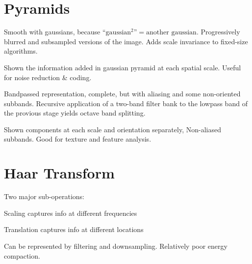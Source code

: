 \section{Pyramids}
\begin{compactdesc}
	\item[\lp{Gaussian pyramid}] 
		Smooth with gaussians, because $\text{``$\text{gaussian}^2$''}=\text{another gaussian}$. 
		Progressively blurred and subsampled versions of the image. Adds scale invariance to fixed-size algorithms.
	\item[\lp{Laplacian Pyramid}]
		Shown the information added in gaussian pyramid at each spatial scale. Useful for noise reduction \& coding.
	\item[\lp{Wavelet/QMF}] Bandpassed representation, complete, but with aliasing and some non-oriented subbands. Recursive application of a two-band filter bank to the lowpass band of the provious stage yields octave band splitting.
	\item[\lp{Steerable pyramid}] Shown components at each scale and orientation separately, Non-aliased subbands. Good for texture and feature analysis.
		\section{Haar Transform}
		Two major sub-operations:\hfill\\
		\begin{enumerate*}[label=\protect\circled{\arabic*},itemjoin=]
			\item Scaling captures info at different frequencies\\
			\item Translation captures info at different locations\\
		\end{enumerate*}
		Can be represented by filtering and downsampling. Relatively poor energy compaction.
\end{compactdesc}
